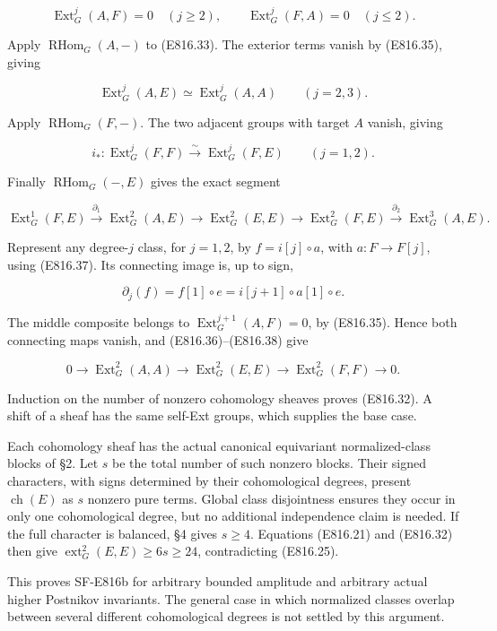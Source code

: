 \[
 \operatorname{Ext}^j_G(A,F)=0\quad(j\ge2),
 \qquad
 \operatorname{Ext}^j_G(F,A)=0\quad(j\le2).
 \tag{E816.35}
\]

Apply \(\operatorname{RHom}_G(A,-)\) to (E816.33). The exterior terms
vanish by (E816.35), giving

\[
 \operatorname{Ext}^j_G(A,E)\simeq\operatorname{Ext}^j_G(A,A)
            \qquad(j=2,3).
 \tag{E816.36}
\]

Apply \(\operatorname{RHom}_G(F,-)\). The two adjacent groups with
target \(A\) vanish, giving

\[
 i_*:\operatorname{Ext}^j_G(F,F)
         \xrightarrow{\sim}\operatorname{Ext}^j_G(F,E)
            \qquad(j=1,2).
 \tag{E816.37}
\]

Finally \(\operatorname{RHom}_G(-,E)\) gives the exact segment

\[
 \operatorname{Ext}^1_G(F,E)\xrightarrow{\partial_1}
 \operatorname{Ext}^2_G(A,E)\longrightarrow
 \operatorname{Ext}^2_G(E,E)\longrightarrow
 \operatorname{Ext}^2_G(F,E)\xrightarrow{\partial_2}
 \operatorname{Ext}^3_G(A,E).
 \tag{E816.38}
\]

Represent any degree-\(j\) class, for \(j=1,2\), by \(f=i[j]\circ a\),
with \(a:F\to F[j]\), using (E816.37). Its connecting image is, up to
sign,

\[
 \partial_j(f)=f[1]\circ e
   =i[j+1]\circ a[1]\circ e.
 \tag{E816.39}
\]

The middle composite belongs to \(\operatorname{Ext}^{j+1}_G(A,F)=0\),
by (E816.35). Hence both connecting maps vanish, and
(E816.36)--(E816.38) give

\[
 0\longrightarrow\operatorname{Ext}^2_G(A,A)
    \longrightarrow\operatorname{Ext}^2_G(E,E)
    \longrightarrow\operatorname{Ext}^2_G(F,F)
    \longrightarrow0.
 \tag{E816.40}
\]

Induction on the number of nonzero cohomology sheaves proves (E816.32).
A shift of a sheaf has the same self-Ext groups, which supplies the base
case.

Each cohomology sheaf has the actual canonical equivariant
normalized-class blocks of §2. Let \(s\) be the total number of such
nonzero blocks. Their signed characters, with signs determined by their
cohomological degrees, present \(\operatorname{ch}(E)\) as \(s\) nonzero
pure terms. Global class disjointness ensures they occur in only one
cohomological degree, but no additional independence claim is needed. If
the full character is balanced, §4 gives \(s\ge4\). Equations (E816.21)
and (E816.32) then give \(\operatorname{ext}^2_G(E,E)\ge6s\ge24\),
contradicting (E816.25).

This proves SF-E816b for arbitrary bounded amplitude and arbitrary
actual higher Postnikov invariants. The general case in which normalized
classes overlap between several different cohomological degrees is not
settled by this argument.
